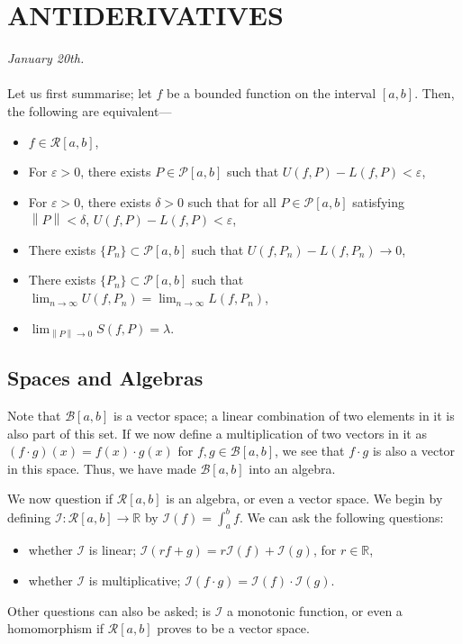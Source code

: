 \documentclass[15pt,a4paper]{book}
\theoremstyle{definition}
\newcommand{\R}{\mathbb{R}} %
\newcommand{\cP}{\mathcal{P}}
\newcommand{\cR}{\mathcal{R}}
\newcommand{\cB}{\mathcal{B}}
\newcommand{\cI}{\mathcal{I}}
\newcommand{\norm}[1]{\left\lVert#1\right\rVert}
\begin{document}
\chapter{ANTIDERIVATIVES}
\textit{January 20th.}\\ \\
Let us first summarise; let $f$ be a bounded function on the interval $[a,b]$. Then, the following are equivalent---
\begin{itemize}
    \item $f \in \cR[a,b]$,
    \item For $\varepsilon > 0$, there exists $P \in \cP[a,b]$ such that $U(f,P)-L(f,P) < \varepsilon$,
    \item For $\varepsilon > 0$, there exists $\delta > 0$ such that for all $P \in \cP[a,b]$ satisfying $\norm{P} < \delta$, $U(f,P)-L(f,P) < \varepsilon$,
    \item There exists $\{P_{n}\} \subset \cP[a,b]$ such that $U(f,P_{n})-L(f,P_{n}) \to 0$,
    \item There exists $\{P_{n}\} \subset \cP[a,b]$ such that $\lim_{n \to \infty} U(f,P_{n}) = \lim_{n \to \infty} L(f,P_{n})$,
    \item $\lim_{\norm{P} \to 0} S(f,P) = \lambda$.
\end{itemize}

\section{Spaces and Algebras}
Note that $\cB[a,b]$ is a vector space; a linear combination of two elements in it is also part of this set. If we now define a multiplication of two vectors in it as $(f \cdot g)(x) = f(x) \cdot g(x)$ for $f,g \in \cB[a,b]$, we see that $f \cdot g$ is also a vector in this space. Thus, we have made $\cB[a,b]$ into an algebra.

We now question if $\cR[a,b]$ is an algebra, or even a vector space. We begin by defining $\cI: \cR[a,b] \to \R$ by $\cI (f) = \int_{a}^{b} f$. We can ask the following questions:
\begin{itemize}
    \item whether $\cI$ is linear; $\cI(rf+g) = r\cI(f) + \cI(g)$, for $r \in \R$,
    \item whether $\cI$ is multiplicative; $\cI(f \cdot g) = \cI(f) \cdot \cI(g)$.
\end{itemize}
Other questions can also be asked; is $\cI$ a monotonic function, or even a homomorphism if $\cR[a,b]$ proves to be a vector space.\\
\end{document}
